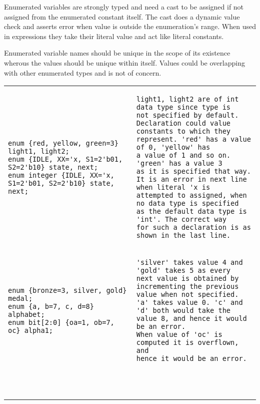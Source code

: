 Enumerated variables are strongly typed and need a cast to be assigned
if not assigned from the enumerated constant itself. The cast does a
dynamic value check and asserts error when value is outside the
enumeration's range. When used in expressions they take their literal
value and act like literal constants.

Enumerated variable names should be unique in the scope of its
existence wherous the values should be unique within itself. Values
could be overlapping with other enumerated types and is not of
concern.

\begin{table}
\begin{tabular}{p{} p{}}

\begin{Verbatim}
enum {red, yellow, green=3} light1, light2;
enum {IDLE, XX='x, S1=2'b01, S2=2'b10} state, next;
enum integer {IDLE, XX='x, S1=2'b01, S2=2'b10} state, next;
\end{Verbatim}
&
\begin{tbldesc}
\begin{verbatim}
light1, light2 are of int data type since type is 
not specified by default.
Declaration could value constants to which they
represent. 'red' has a value of 0, 'yellow' has
a value of 1 and so on. 'green' has a value 3
as it is specified that way.
It is an error in next line when literal 'x is
attempted to assigned, when no data type is specified
as the default data type is 'int'. The correct way
for such a declaration is as shown in the last line.
\end{verbatim}
\end{tbldesc}
\\
\begin{Verbatim}
enum {bronze=3, silver, gold} medal;
enum {a, b=7, c, d=8} alphabet;
enum bit[2:0] {oa=1, ob=7, oc} alpha1;
\end{Verbatim}
&
\begin{tbldesc}
\begin{verbatim}
'silver' takes value 4 and 'gold' takes 5 as every
next value is obtained by incrementing the previous
value when not specified.
'a' takes value 0. 'c' and 'd' both would take the
value 8, and hence it would be an error.
When value of 'oc' is computed it is overflown, and
hence it would be an error.
\end{verbatim}
\end{tbldesc}
\\
\begin{Verbatim}


\end{Verbatim}
\end{tabular}
\end{table}
